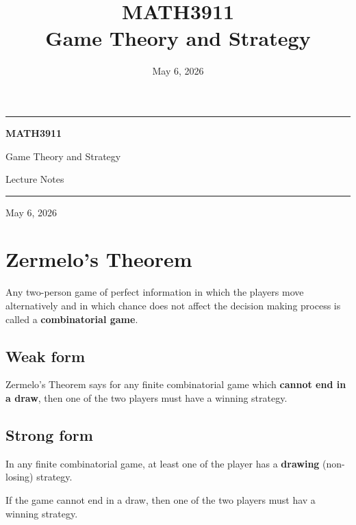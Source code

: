 \documentclass[11pt,a4paper]{article}
\title{\textbf{\Huge MATH3911}\\[0.35em]\Large Game Theory and Strategy}
\author{}
\date{May 6, 2026}
\begin{document}
\begin{titlepage}
    \centering
    \vspace*{0.22\textheight}
    {\color{headingblue}\rule{0.75\textwidth}{0.8pt}\par}
    \vspace{1.2em}
    {\Huge\bfseries MATH3911\par}
    \vspace{0.55em}
    {\Large Game Theory and Strategy\par}
    \vspace{1.0em}
    {\large Lecture Notes\par}
    \vspace{1.2em}
    {\color{headingblue}\rule{0.75\textwidth}{0.8pt}\par}
    \vfill
    {\large May 6, 2026\par}
\end{titlepage}

\tableofcontents
\newpage
{}

\section{Zermelo's Theorem}
Any two-person game of perfect information in which the players move alternatively and in which chance does not affect the decision making process is called a \textbf{combinatorial game}. \par

\subsection{Weak form}
Zermelo's Theorem says for any finite combinatorial game which \textbf{cannot end in a draw}, then one of the two players must have a winning strategy. \par

\subsection{Strong form}
\par In any finite combinatorial game, at least one of the player has a \textbf{drawing}
(non-losing) strategy. \par
If the game cannot end in a draw, then one of the two players must hav a winning strategy. \par
\end{document}
